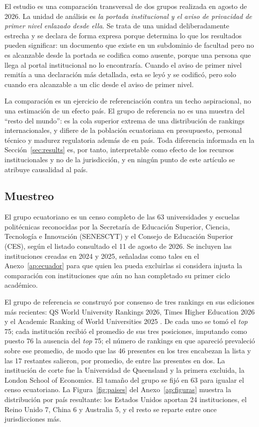 \documentclass[pdflatex,sn-basic,Numbered]{sn-jnl}
\theoremstyle{thmstyleone}
\theoremstyle{thmstyletwo}
\theoremstyle{thmstylethree}
\begin{document}
El estudio es una comparaci\'on transversal de dos grupos realizada en agosto de 2026. La unidad de an\'alisis es \emph{la portada institucional y el aviso de privacidad de primer nivel enlazado desde ella}. Se trata de una unidad deliberadamente estrecha y se declara de forma expresa porque determina lo que los resultados pueden significar: un documento que existe en un subdominio de facultad pero no es alcanzable desde la portada se codifica como ausente, porque una persona que llega al portal institucional no lo encontrar\'ia. Cuando el aviso de primer nivel remit\'ia a una declaraci\'on m\'as detallada, esta se ley\'o y se codific\'o, pero solo cuando era alcanzable a un clic desde el aviso de primer nivel.

La comparaci\'on es un ejercicio de referenciaci\'on contra un techo aspiracional, no una estimaci\'on de un efecto pa\'is. El grupo de referencia no es una muestra del ``resto del mundo'': es la cola superior extrema de una distribuci\'on de rankings internacionales, y difiere de la poblaci\'on ecuatoriana en presupuesto, personal t\'ecnico y madurez regulatoria adem\'as de en pa\'is. Toda diferencia informada en la Secci\'on~\ref{sec:results} es, por tanto, interpretable como efecto de los recursos institucionales y no de la jurisdicci\'on, y en ning\'un punto de este art\'iculo se atribuye causalidad al pa\'is.

\subsection{Muestreo}\label{sec:methods-sampling}

El grupo ecuatoriano es un censo completo de las 63 universidades y escuelas polit\'ecnicas reconocidas por la Secretar\'ia de Educaci\'on Superior, Ciencia, Tecnolog\'ia e Innovaci\'on (SENESCYT) y el Consejo de Educaci\'on Superior (CES), seg\'un el listado consultado el 11 de agosto de 2026. Se incluyen las instituciones creadas en 2024 y 2025, se\~naladas como tales en el Anexo~\ref{ap:ecuador} para que quien lea pueda excluirlas si considera injusta la comparaci\'on con instituciones que a\'un no han completado su primer ciclo acad\'emico.

El grupo de referencia se construy\'o por consenso de tres rankings en sus ediciones m\'as recientes: QS World University Rankings 2026, Times Higher Education 2026 y el Academic Ranking of World Universities 2025 \citep{qs2026,the2026,arwu2025}. De cada uno se tom\'o el \emph{top} 75; cada instituci\'on recibi\'o el promedio de sus tres posiciones, imputando como puesto 76 la ausencia del \emph{top} 75; el n\'umero de rankings en que apareci\'o prevaleci\'o sobre ese promedio, de modo que las 46 presentes en los tres encabezan la lista y las 17 restantes salieron, por promedio, de entre las presentes en dos. La instituci\'on de corte fue la Universidad de Queensland y la primera excluida, la London School of Economics. El tama\~no del grupo se fij\'o en 63 para igualar el censo ecuatoriano. La Figura~\ref{fig:paises} del Anexo~\ref{ap:figuras} muestra la distribuci\'on por pa\'is resultante: los Estados Unidos aportan 24 instituciones, el Reino Unido 7, China 6 y Australia 5, y el resto se reparte entre once jurisdicciones m\'as.
\end{document}
